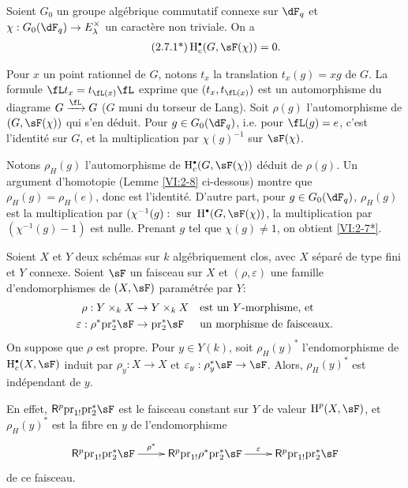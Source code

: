 \begin{theorem*}[2.7*]\label{VI:2-7*}
Soient $G_0$ un groupe alg\'ebrique commutatif connexe sur $\dF_q$ et 
$\chi:G_0(\dF_q) \to E_\lambda^\times$ un caract\`ere non triviale. On a 
\begin{align*}\tag{2.7.1*}\label{VI:eq:2-7-1*}
  \h_c^\bullet(G,\sF(\chi)) = 0 \text{.}
\end{align*}
\end{theorem*}

Pour $x$ un point rationnel de $G$, notons $t_x$ la translation $t_x(g) = x g$ 
de $G$. La formule $\fL t_x = t_{\fL(x)} \fL$ exprime que $(t_x,t_{\fL(x)})$ 
est un automorphisme du diagrame $G\xrightarrow\fL G$ ($G$ muni du torseur de 
Lang). Soit $\rho(g)$ l'automorphisme de $(G,\sF(\chi))$ qui s'en d\'eduit. 
Pour $g\in G_0(\dF_q)$, i.e. pour $\fL(g) = e$, c'est l'identit\'e sur $G$, et 
la multiplication par $\chi(g)^{-1}$ sur $\sF(\chi)$. 

Notons $\rho_H(g)$ l'automorphisme de $\h_c^\bullet(G,\sF(\chi))$ d\'eduit de 
$\rho(g)$. Un argument d'homotopie (Lemme \ref{VI:2-8} ci-dessous) montre que 
$\rho_H(g) = \rho_H(e)$, donc est l'identit\'e. D'autre part, pour 
$g\in G_0(\dF_q)$, $\rho_H(g)$ est la multiplication par 
$(\chi^{-1}(g):\text{ sur }\h^\bullet(G,\sF(\chi))$, la multiplication par 
$(\chi^{-1}(g)-1)$ est nulle. Prenant $g$ tel que $\chi(g)\ne 1$, on obtient 
\ref{VI:2-7*}. 





\begin{lemma_}\label{VI:2-8}
Soient $X$ et $Y$ deux sch\'emas sur $k$ alg\'ebriquement clos, avec $X$ 
s\'epar\'e de type fini et $Y$ connexe. Soient $\sF$ un faisceau sur $X$ et 
$(\rho,\varepsilon)$ une famille d'endomorphismes de $(X,\sF)$ param\'etr\'ee 
par $Y$: 
\begin{align*} 
  \rho:Y\times_k X &\to Y\times_k X && \text{est un $Y$-morphisme, et} \\
  \varepsilon:\rho^\ast \pr_2^\ast \sF &\to \pr_2^\ast\sF && \text{un morphisme de faisceaux.} 
\end{align*}
On suppose que $\rho$ est propre. Pour $y\in Y(k)$, soit $\rho_H(y)^\ast$ 
l'endomorphisme de $\h_c^\bullet(X,\sF)$ induit par $\rho_y:X\to X$ et 
$\varepsilon_y:\rho_y^\ast\sF\to \sF$. Alors, $\rho_H(y)^\ast$ est 
ind\'ependant de $y$. 
\end{lemma_}

En effet, $\R^p \pr_{1!} \pr_2^\ast\sF$ est le 
faisceau constant sur $Y$ de valeur $\h^p(X,\sF)$, et $\rho_H(y)^\ast$ est la 
fibre en $y$ de l'endomorphisme 
\[\xymatrix{
  \R^p \pr_{1!} \pr_2^\ast \sF \ar[r]^-{\rho^\ast} 
    & \R^p \pr_{1!} \rho^\ast \pr_2^\ast \sF \ar[r]^-\varepsilon 
    & \R^p \pr_{1!} \pr_2^\ast \sF 
}\]
de ce faisceau. 





